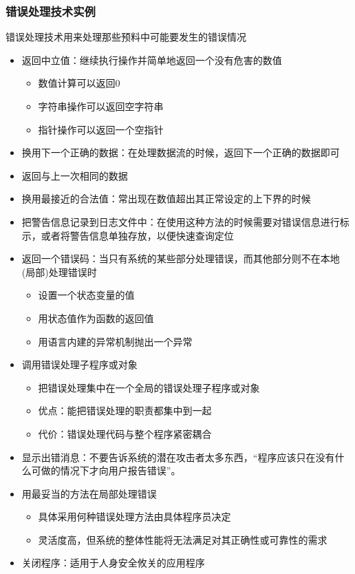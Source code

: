 \subsubsection{错误处理技术实例}
错误处理技术用来处理那些预料中可能要发生的错误情况
\begin{itemize}
    \item 返回中立值：继续执行操作并简单地返回一个没有危害的数值
    \begin{itemize}
        \item 数值计算可以返回0
        \item 字符串操作可以返回空字符串
        \item 指针操作可以返回一个空指针
    \end{itemize}
    \item 换用下一个正确的数据：在处理数据流的时候，返回下一个正确的数据即可
    \item 返回与上一次相同的数据
    \item 换用最接近的合法值：常出现在数值超出其正常设定的上下界的时候
    \item 把警告信息记录到日志文件中：在使用这种方法的时候需要对错误信息进行标示，或者将警告信息单独存放，以便快速查询定位
    \item 返回一个错误码：当只有系统的某些部分处理错误，而其他部分则不在本地(局部)处理错误时
    \begin{itemize}
        \item 设置一个状态变量的值
        \item 用状态值作为函数的返回值
        \item 用语言内建的异常机制抛出一个异常
    \end{itemize}
    \item 调用错误处理子程序或对象
    \begin{itemize}
        \item 把错误处理集中在一个全局的错误处理子程序或对象
        \item 优点：能把错误处理的职责都集中到一起
        \item 代价：错误处理代码与整个程序紧密耦合
    \end{itemize}
    \item 显示出错消息：不要告诉系统的潜在攻击者太多东西，“程序应该只在没有什么可做的情况下才向用户报告错误”。
    \item 用最妥当的方法在局部处理错误
    \begin{itemize}
        \item 具体采用何种错误处理方法由具体程序员决定
        \item 灵活度高，但系统的整体性能将无法满足对其正确性或可靠性的需求
    \end{itemize}
    \item 关闭程序：适用于人身安全攸关的应用程序
\end{itemize}

